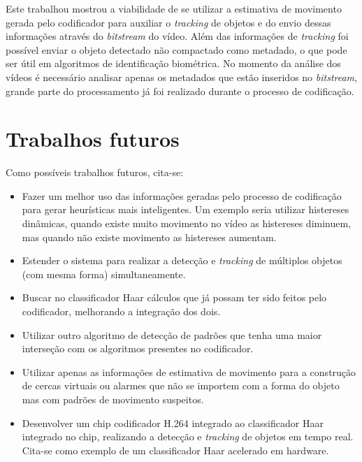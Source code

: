 Este trabalhou mostrou a viabilidade de se utilizar a estimativa de movimento gerada pelo codificador para auxiliar o \textit{tracking} de objetos e do envio dessas informações através do \textit{bitstream} do vídeo. Além das informações de \textit{tracking} foi possível enviar o objeto detectado não compactado como metadado, o que pode ser útil em algoritmos de identificação biométrica. No momento da análise dos vídeos é necessário analisar apenas os metadados que estão inseridos no \textit{bitstream}, grande parte do processamento já foi realizado durante o processo de codificação. 


\section{Trabalhos futuros}

Como possíveis trabalhos futuros, cita-se: 

\begin{itemize}
        \item Fazer um melhor uso das informações geradas pelo processo de codificação para gerar heurísticas mais inteligentes. Um exemplo seria utilizar histereses dinâmicas, quando existe muito movimento no vídeo as histereses diminuem, mas quando não existe movimento as histereses aumentam.
        \item Estender o sistema para realizar a detecção e \textit{tracking} de múltiplos objetos (com mesma forma) simultaneamente.
        \item Buscar no classificador Haar cálculos que já possam ter sido feitos pelo codificador, melhorando a integração dos dois.
        \item Utilizar outro algoritmo de detecção de padrões que tenha uma maior interseção com os algoritmos presentes no codificador.
        \item Utilizar apenas as informações de estimativa de movimento para a construção de cercas virtuais ou alarmes que não se importem com a forma do objeto mas com padrões de movimento suspeitos.
        \item Desenvolver um chip codificador H.264 integrado ao classificador Haar integrado no chip, realizando a detecção e \textit{tracking} de objetos em tempo real. Cita-se \cite{haarFPGA} como exemplo de um classificador Haar acelerado em hardware.
\end{itemize}
  
